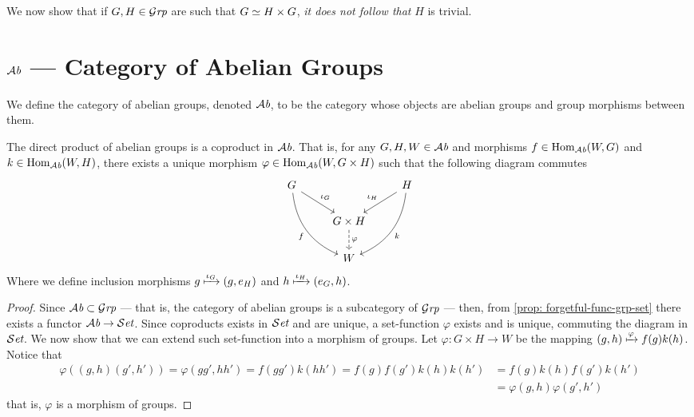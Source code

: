 \begin{remark}
  We now show that if \(G, H \in {\mathcal{G}\textit{rp}}\) are such that \(G \simeq H \times G\),
  \emph{it does not follow that} \(H\) is trivial.
\end{remark}

\section{\texorpdfstring{\(\Ab\)}{Ab} --- Category of Abelian Groups}

\begin{definition}
  We define the category of abelian groups, denoted \(\Ab\), to be the category
  whose objects are abelian groups and group morphisms between them.
\end{definition}

\begin{proposition}[Coproduct in \(\Ab\)]\label{prop: coprod-ab}
  The direct product of abelian groups is a coproduct in \(\Ab\). That is, for
  any \(G, H, W \in {\mathcal{A}\textit{b}}\) and morphisms \(f \in \operatorname{Hom}_{\mathcal{A}\textit{b}}(W, G)\) and \(k \in
  \operatorname{Hom}_{\mathcal{A}\textit{b}}(W, H)\), there exists a unique morphism \(\varphi \in \operatorname{Hom}_{\mathcal{A}\textit{b}}(W, G
  \times H)\) such that the following diagram commutes
  \[
    \begin{tikzcd}
      G \ar[dr, "\iota_G"] \ar[ddr, bend right, swap, "f"] &
      &H \ar[dl, swap, "\iota_H"] \ar[ddl, bend left, "k"] \\
      &G \times H \ar[d, dashed, "\varphi"]  & \\
      &W &
    \end{tikzcd}
  \]
  Where we define inclusion morphisms \(g \xmapsto{\iota_G} (g, e_H)\) and \(h
  \xmapsto{\iota_H} (e_G, h)\).
\end{proposition}

\begin{proof}
  Since \({\mathcal{A}\textit{b}} \subset {\mathcal{G}\textit{rp}}\) --- that is, the category of abelian groups is a
  subcategory of \({\mathcal{G}\textit{rp}}\) --- then, from \cref{prop: forgetful-func-grp-set}
  there exists a functor \({\mathcal{A}\textit{b}} \to {\mathcal{S}\textit{et}}\). Since coproducts exists in \({\mathcal{S}\textit{et}}\)
  and are unique, a set-function \(\varphi\) exists and is unique, commuting the
  diagram in \({\mathcal{S}\textit{et}}\). We now show that we can extend such set-function into a
  morphism of groups. Let \(\varphi: G \times H \to W\) be the mapping \((g, h)
  \xmapsto \varphi f(g) k(h)\). Notice that
  \begin{align*}
    \varphi((g, h)(g', h'))
    = \varphi(gg', hh')
    = f(g g') k(hh')
    = f(g) f(g') k(h) k(h')
    &= f(g) k(h) f(g') k(h') \\
    &= \varphi(g, h) \varphi(g', h')
  \end{align*}
  that is, \(\varphi\) is a morphism of groups.
\end{proof}

